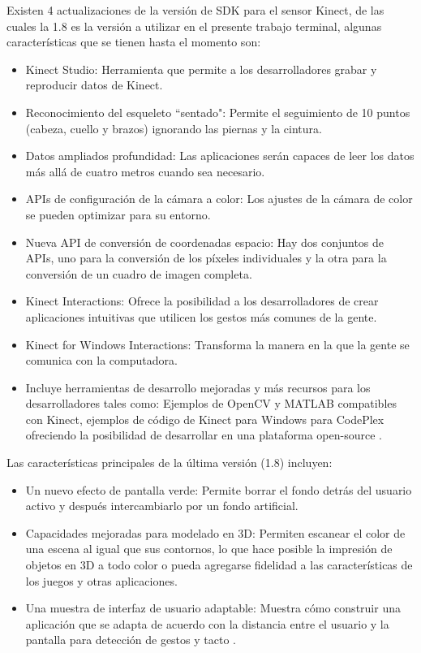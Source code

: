 Existen 4 actualizaciones de la versión de SDK para el sensor Kinect, de las cuales la 1.8 es la versión a utilizar en el presente trabajo terminal, algunas características que se tienen hasta el momento son:
\begin{itemize}
\item Kinect Studio: Herramienta que permite a los desarrolladores grabar y reproducir datos de Kinect.
\item Reconocimiento del esqueleto ``sentado": Permite el seguimiento de 10 puntos (cabeza, cuello y brazos) ignorando las piernas y la cintura.
\item Datos ampliados profundidad: Las aplicaciones serán capaces de leer los datos más allá de cuatro metros cuando sea necesario.                                                                                                                  
\item APIs de configuración de la cámara a color: Los ajustes de la cámara de color se pueden optimizar para su entorno.
\item Nueva API de conversión de coordenadas espacio: Hay dos conjuntos de APIs, uno para la conversión de los píxeles individuales y la otra para la conversión de un cuadro de imagen completa.
\item Kinect Interactions: Ofrece la posibilidad a los desarrolladores de crear aplicaciones intuitivas que utilicen los gestos más comunes de la gente.
\item Kinect for Windows Interactions: Transforma la manera en la que la gente se comunica con la computadora.
\item Incluye herramientas de desarrollo mejoradas y más recursos para los desarrolladores tales como: Ejemplos de OpenCV y MATLAB compatibles con Kinect, ejemplos de código de Kinect para Windows para CodePlex ofreciendo la posibilidad de desarrollar en una plataforma open-source \cite{Heddle1}.
\end{itemize} 

Las características principales de la última versión (1.8) incluyen: 
\begin{itemize}
\item Un nuevo efecto de pantalla verde: Permite borrar el fondo detrás del usuario activo y después intercambiarlo por un fondo artificial.
\item Capacidades mejoradas para modelado en 3D: Permiten escanear el color de una escena al igual que sus contornos, lo que hace posible la impresión de objetos en 3D a todo color o pueda agregarse fidelidad a las características de los juegos y otras aplicaciones.
\item Una muestra de interfaz de usuario adaptable: Muestra cómo construir una aplicación que se adapta de acuerdo con la distancia entre el usuario y la pantalla para detección de gestos y tacto \cite{Heddle2}.
\end{itemize}
